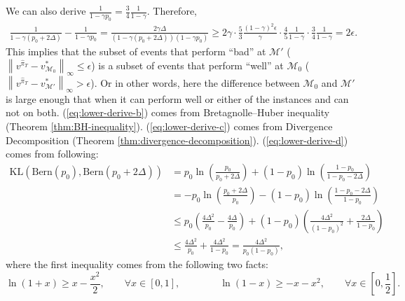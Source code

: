 \documentclass[12pt]{article}
\begin{document}
We can also derive $\frac{1}{1-\gamma p_0} = \frac{3}{4} \frac{1}{1 - \gamma}$. Therefore,
\begin{equation*}
    \begin{aligned}
    \frac{1}{1 - \gamma(p_0 + 2 \Delta)} - \frac{1}{1 - \gamma p_0} = \frac{2\gamma \Delta}{(1 - \gamma(p_0 + 2 \Delta))(1 - \gamma p_0)} \ge 2 \gamma \cdot \frac{5}{3} \frac{(1-\gamma)^2 \epsilon}{\gamma} \cdot \frac{4}{5} \frac{1}{1 - \gamma} \cdot \frac{3}{4} \frac{1}{1 - \gamma} = 2 \epsilon.
    \end{aligned}
\end{equation*}
This implies that the subset of events that perform ``bad'' at $\mathcal{M}'$ ($\left\| v^{\hat{\pi}_T} - v^*_{\mathcal{M}_0} \right \|_{\infty} \le \epsilon$) is a subset of events that perform ``well'' at $\mathcal{M}_0$ ($\left\| v^{\hat{\pi}_T} - v^*_{\mathcal{M}'} \right \|_{\infty}  >\epsilon$). Or in other words, here the difference between $\mathcal{M}_0$ and $\mathcal{M}'$ is large enough that when it can perform well or either of the instances and can not on both. (\ref{eq:lower-derive-b}) comes from Bretagnolle–Huber inequality (Theorem \ref{thm:BH-inequality}). (\ref{eq:lower-derive-c}) comes from Divergence Decomposition (Theorem \ref{thm:divergence-decomposition}). (\ref{eq:lower-derive-d}) comes from following:
\begin{equation*}
    \begin{aligned}
    \text{KL}\left(\text{Bern}\left( p_0\right),\text{Bern}\left( p_0 + 2 \Delta\right)\right) & = p_0 \ln \left(\frac{p_0}{p_0 + 2 \Delta} \right) + (1 -p_0) \ln \left(\frac{1 - p_0}{1 - p_0 - 2 \Delta} \right) \\
    & = - p_0 \ln \left(\frac{p_0 + 2 \Delta}{p_0 } \right) - (1 -p_0) \ln \left(\frac{1 - p_0 - 2\Delta}{1 - p_0 } \right) \\
    & \le p_0 \left (\frac{4\Delta^2}{p_0} - \frac{4\Delta}{p_0}\right) + (1-p_0) \left(\frac{4\Delta^2}{(1-p_0)^2} + \frac{2 \Delta}{1 - p_0}\right) \\
    &  \le \frac{4\Delta^2}{p_0} + \frac{4 \Delta^2}{ 1- p_0} = \frac{4 \Delta^2}{p_0(1 - p_0)},
    \end{aligned}
\end{equation*}
where the first inequality comes from the following two facts:
\begin{equation*}
    \ln (1 + x) \ge x - \frac{x^2}{2}, \qquad \forall x \in [0,1], \qquad \qquad \ln(1- x) \ge - x - x^2,\qquad \forall x \in \left[0,\frac{1}{2} \right].
\end{equation*}
\end{document}
